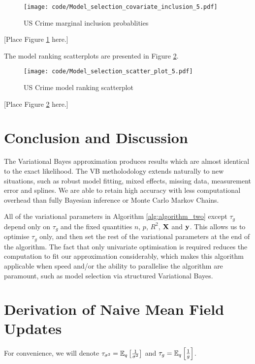 \documentclass{amsart}[12pt]
\begin{document}
\begin{figure}[p]
	\texttt{[image: code/Model\_selection\_covariate\_inclusion\_5.pdf]}
	\caption{US Crime marginal inclusion probablities}
	\label{fig:USCrime_inclusion}
\end{figure}

[Place Figure \ref{fig:USCrime_inclusion} here.]

The model ranking scatterplots are presented in Figure \ref{fig:USCrime_model_ranking}.

\begin{figure}[p]
	\texttt{[image: code/Model\_selection\_scatter\_plot\_5.pdf]}
	\caption{US Crime model ranking scatterplot}
	\label{fig:USCrime_model_ranking}
\end{figure}

[Place Figure \ref{fig:USCrime_model_ranking} here.]

\section{Conclusion and Discussion}
\label{sec:conclusion}

The Variational Bayes approximation produces results which are almost identical to the exact likelihood.
The VB metholodology extends naturally to new situations, such as robust model fitting, mixed effects, missing
data, measurement error and splines. We are able to retain high accuracy with less computational overhead than
fully Bayesian inference or Monte Carlo Markov Chains.

All of the variational parameters in Algorithm \ref{alg:algorithm_two} except $\tau_g$ depend only on $\tau_g$
and the fixed quantities $n$, $p$, $R^2$, ${\bf X}$ and ${\bf y}$. This allows us to optimise $\tau_g$ only, and then
set the rest of the variational parameters at the end of the algorithm. The fact that only univariate
optimisation is required reduces the computation to fit our approximation considerably, which makes this
algorithm applicable when speed and/or the ability to parallelise the algorithm are paramount, such as model
selection via structured Variational Bayes.




\appendix
\section{Derivation of Naive Mean Field Updates}
\label{sec:appendix}
For convenience, we will denote $\tau_{\sigma^2} = \mathbb{E}_q \left[ \frac{1}{\sigma^2} \right]$ and $\tau_{g} =
\mathbb{E}_q \left[ \frac{1}{g} \right]$.
\end{document}
